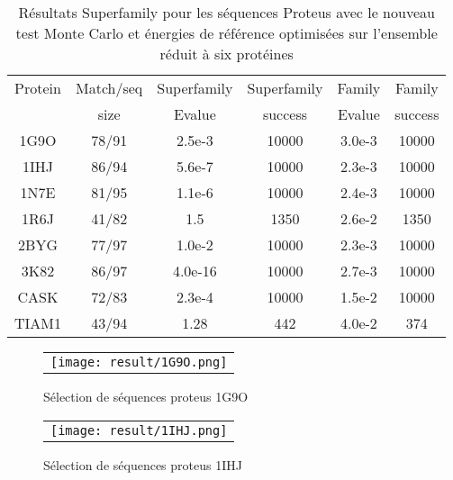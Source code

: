\begin{table}[h]
  \raggedleft{}
  
  \begin{tabular}{cccccc}
    
    \toprule
    Protein & Match/seq & Superfamily & Superfamily & Family & Family \\
            & size      & Evalue      & success     & Evalue & success\\
    \cmidrule{1-6}
    1G9O  & 78/91 & 2.5e-3  & 10000 & 3.0e-3 & 10000 \\
    1IHJ  & 86/94 & 5.6e-7  & 10000 & 2.3e-3 & 10000 \\
    1N7E  & 81/95 & 1.1e-6  & 10000 & 2.4e-3 & 10000 \\
    1R6J  & 41/82 & 1.5     &  1350 & 2.6e-2 &  1350 \\
    2BYG  & 77/97 & 1.0e-2  & 10000 & 2.3e-3 & 10000 \\
    3K82  & 86/97 & 4.0e-16 & 10000 & 2.7e-3 & 10000 \\
    \cmidrule{1-6}
    CASK  & 72/83 & 2.3e-4  & 10000 & 1.5e-2 & 10000 \\
    TIAM1 & 43/94 & 1.28    & 442   & 4.0e-2 & 374 \\
    \bottomrule        
  \end{tabular}   
  \caption{Résultats Superfamily pour les séquences Proteus avec le nouveau test Monte Carlo et énergies de référence optimisées sur l'ensemble réduit à six protéines}   
  \label{tab:superfamily_Old_MCtest}       
\end{table}




    \clearpage


   \begin{figure}[t]
     \centering
     \begin{tabular}{c}
       \texttt{[image: result/1G9O.png]} \\
     \end{tabular}
     \caption{Sélection de séquences proteus 1G9O }
\label{result:1G9O}
   \end{figure}

   \begin{figure}[t]
     \centering
     \begin{tabular}{c}
       \texttt{[image: result/1IHJ.png]} \\
     \end{tabular}
     \caption{Sélection de séquences proteus 1IHJ }
\label{result:1IHJ}
   \end{figure}

